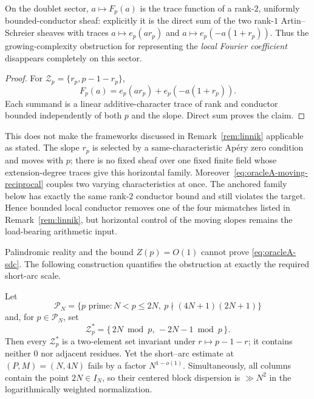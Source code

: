 \begin{proposition}
\label{prop:oracleA-doublet-trace}
On the doublet sector, $a\mapsto F_p(a)$ is the trace function of a
rank-$2$, uniformly bounded-conductor sheaf: explicitly it is the direct
sum of the two rank-$1$ Artin--Schreier sheaves with traces
$a\mapsto e_p(ar_p)$ and
$a\mapsto e_p(-a(1+r_p))$.  Thus the growing-complexity obstruction for
representing the \emph{local Fourier coefficient} disappears completely
on this sector.
\end{proposition}

\begin{proof}
For $\mathcal Z_p=\{r_p,p-1-r_p\}$,
\[
 F_p(a)=e_p(ar_p)+e_p(-a(1+r_p)).
\]
Each summand is a linear additive-character trace of rank and conductor
bounded independently of both $p$ and the slope.  Direct sum proves the
claim.
\end{proof}

This does not make the frameworks discussed in Remark~\ref{rem:linnik}
applicable as stated.  The slope $r_p$ is selected by a same-characteristic
Ap\'ery zero condition and moves with $p$; there is no fixed sheaf over one
fixed finite field whose extension-degree traces give this horizontal
family.  Moreover~\eqref{eq:oracleA-moving-reciprocal} couples two varying
characteristics at once.  The anchored family below has exactly the same
rank-$2$ conductor bound and still violates the target.  Hence bounded
local conductor removes one of the four mismatches listed in
Remark~\ref{rem:linnik}, but horizontal control of the moving slopes
remains the load-bearing arithmetic input.

Palindromic reality and the bound $Z(p)=O(1)$ cannot prove
\eqref{eq:oracleA-sdc}.  The following construction quantifies the
obstruction at exactly the required short-arc scale.

\begin{proposition}
\label{prop:oracleA-anchored}
Let
\[
 \mathcal P_N=\{p\text{ prime}:N<p\leq2N,\
                     p\nmid(4N+1)(2N+1)\}
\]
and, for $p\in\mathcal P_N$, set
\[
 \mathcal Z_p^*=\{\,2N\bmod p,\,-2N-1\bmod p\,\}.
\]
Then every $\mathcal Z_p^*$ is a two-element set invariant under
$r\mapsto p-1-r$; it contains neither $0$ nor adjacent residues.  Yet the
short--arc estimate at $(P,M)=(N,4N)$ fails by a factor
$N^{1-o(1)}$.  Simultaneously, all columns contain the point
$2N\in I_N$, so their centered block dispersion is $\gg N^2$ in the
logarithmically weighted normalization.
\end{proposition}

